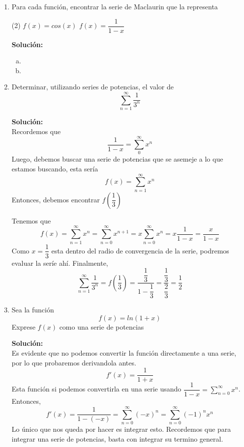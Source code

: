 \documentclass[12pt]{article}
\newenvironment{solucion}
{\begin{mdframed}[backgroundcolor=black!10]
		{\bf Solución:}\\
	}
	{
	\end{mdframed}
}
\newenvironment{preguntas}
{\begin{enumerate}\itemsep12pt
	}
	{
	\end{enumerate}
}
\begin{document}
\begin{preguntas}
\item Para cada función, encontrar la serie de Maclaurin que la representa
\begin{tasks}(2)
\task $f(x) = cos(x)$
\task $f(x) = \dfrac{1}{1-x}$
\end{tasks}
\begin{solucion}

\begin{enumerate}[a)]
\item 
\item 
\end{enumerate}
\end{solucion}
\item Determinar, utilizando series de potencias, el valor de
	$$\sum\limits_{n=1}^\infty \frac{1}{3^n}$$
\begin{solucion}
Recordemos que $$\dfrac{1}{1-x} = \sum\limits_0^{\infty} x^n$$
		Luego, debemos buscar una serie de potencias que se asemeje a lo que estamos buscando, esta sería
		$$f(x) = \sum\limits_{n=1}^\infty x^{n}$$
		Entonces, debemos encontrar $f\left(\dfrac{1}{3}\right)$
		
		Tenemos que
		$$f(x) 
		= \sum\limits_{n=1}^\infty x^{n} 
		= \sum\limits_{n=0}^\infty x^{n+1}
		= x\sum\limits_{n=0}^\infty x^{n}
		= x \dfrac{1}{1-x}
		= \dfrac{x}{1-x}$$
		Como $x = \dfrac{1}{3}$ esta dentro del radio de convergencia de la serie, podremos evaluar la seríe ahí. Finalmente,
		$$\sum\limits_{n=1}^\infty \frac{1}{3^n} = f\left(\dfrac{1}{3}\right) = \dfrac{\dfrac{1}{3}}{1-\dfrac{1}{3}}
		= \dfrac{\dfrac{1}{3}}{\dfrac{2}{3}} = \dfrac{1}{2}$$
\end{solucion}
\item Sea la función
	$$f(x) = ln(1+x)$$
	Exprese $f(x)$ como una serie de potencias
\begin{solucion}
Es evidente que no podemos convertir la función directamente a una serie, por lo que probaremos derivandola antes.
		$$f'(x) = \dfrac{1}{1+x}$$
		Esta función si podemos convertirla en una serie usando $\dfrac{1}{1-x} = \sum\limits_{n=0}^{\infty} x^n$. Entonces,
		$$f'(x) = \dfrac{1}{1-(-x)} 
		= \sum\limits_{n=0}^{\infty} (-x)^n
		= \sum\limits_{n=0}^{\infty} (-1)^n x^n$$
		Lo único que nos queda por hacer es integrar esto. Recordemos que para integrar una serie de potencias, basta con integrar su termino general.
		

\end{solucion}
\end{preguntas}
\end{document}
